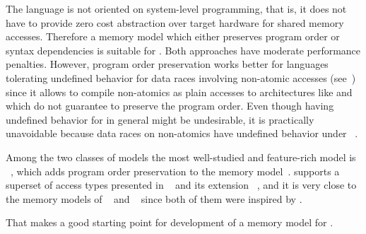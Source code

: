The language is not oriented on system-level programming,
that is, it does not have to provide zero cost abstraction over target hardware
for shared memory accesses.
Therefore a memory model which either preserves program order 
or syntax dependencies is suitable for \Kotlin.
Both approaches have moderate performance penalties.
However, program order preservation works better for languages tolerating undefined behavior
for data races involving non-atomic accesses (see~\cite{Ou-Demsky:OOPSLA18})
since it allows to compile non-atomics as plain accesses to architectures like \ARM and \POWER
which do not guarantee to preserve the program order. 
Even though having undefined behavior for \Kotlin in general might be undesirable,
it is practically unavoidable because data races on non-atomics have undefined
behavior under \LLVM~\cite{Chakraborty-Vafeiadis:CGO17}.

Among the two classes of models the most well-studied and feature-rich model is
\RCMM~\cite{Lahav-al:PLDI17}, which adds program order preservation 
to the \CMM memory model~\cite{Batty-al:POPL11}.
\RCMM supports a superset of access types presented in \JMM~\cite{Manson-al:POPL05}
and its extension \JAM~\cite{Bender-Palsberg:OOPSLA19}, 
and it is very close to the memory models of \JS~\cite{Watt-al:PLDI2020} 
and \LLVM~\cite{Chakraborty-Vafeiadis:CGO17} since both of them were inspired by \CMM. 

That makes \RCMM a good starting point for development of a memory model for \Kotlin.
